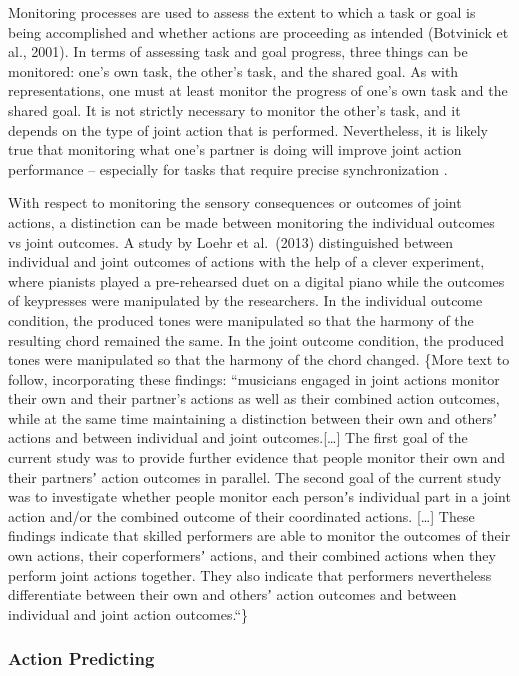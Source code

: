\documentclass[10pt,a4paper,onecolumn]{article}
\begin{document}
Monitoring processes are used to assess the extent to which a task or goal is being accomplished and whether actions are proceeding as intended (Botvinick et al., 2001). In terms of assessing task and goal progress, three things can be monitored: one's own task, the other's task, and the shared goal. As with representations, one must at least monitor the progress of one's own task and the shared goal. It is not strictly necessary to monitor the other's task, and it depends on the type of joint action that is performed. Nevertheless, it is likely true that monitoring what one's partner is doing will improve joint action performance -- especially for tasks that require precise synchronization \autocite{vesperMinimalArchitectureJoint2010}.

With respect to monitoring the sensory consequences or outcomes of joint actions, a distinction can be made between monitoring the individual outcomes vs joint outcomes. A study by Loehr et al.~(2013) distinguished between individual and joint outcomes of actions with the help of a clever experiment, where pianists played a pre-rehearsed duet on a digital piano while the outcomes of keypresses were manipulated by the researchers. In the individual outcome condition, the produced tones were manipulated so that the harmony of the resulting chord remained the same. In the joint outcome condition, the produced tones were manipulated so that the harmony of the chord changed. \{More text to follow, incorporating these findings: ``musicians engaged in joint actions monitor their own and their partner's actions as well as their combined action outcomes, while at the same time maintaining a distinction between their own and othersʼ actions and between individual and joint outcomes.{[}\ldots{]} The first goal of the current study was to provide further evidence that people monitor their own and their partnersʼ action outcomes in parallel. The second goal of the current study was to investigate whether people monitor each personʼs individual part in a joint action and/or the combined outcome of their coordinated actions. {[}\ldots{]} These findings indicate that skilled performers are able to monitor the outcomes of their own actions, their coperformersʼ actions, and their combined actions when they perform joint actions together. They also indicate that performers nevertheless differentiate between their own and othersʼ action outcomes and between individual and joint action outcomes.``\}

\hypertarget{action-predicting}{%
\subsubsection{Action Predicting}\label{action-predicting}}
\end{document}
